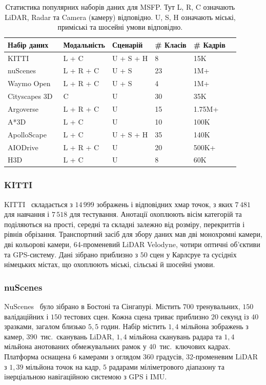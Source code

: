\begin{table}[t]
\centering
\caption{Статистика популярних наборів даних для MSFP. Тут L, R, C означають LiDAR, Radar та Camera (камеру) відповідно. U, S, H означають міські, приміські та шосейні умови відповідно.}
\label{tab:3Ddatasets}
\begin{tabular}{l|lllll}
\hline
\textbf{Набір даних} & \textbf{Модальність} & \textbf{Сценарій} & \textbf{\# Класів} & \textbf{\# Кадрів} \\
\hline
KITTI~\cite{geiger2012kitti}  & L + C & U + S + H & 8 & 15K \\
nuScenes~\cite{caesar2020nuscenes}  & L + R + C & U + S & 23 & 1M+ \\
Waymo Open~\cite{sun2020waymo}  & L + R + C & U + S & 4 & 1M+ \\
Cityscapes 3D~\cite{Gahlert2020Cityscapes3D} & C  & U & 30 & 35K \\
Argoverse~\cite{chang2019argoverse} & L + R + C & U & 15 & 1.75M+ \\
A*3D~\cite{pham2020a3d} & L + C  & U & 10 & 100K \\
ApolloScape~\cite{huang2018apolloscape} & L + C & U + S + H & 35 & 140K \\
AIODrive~\cite{weng2020all} & L + R + C  & U & 20 & 500K+ \\
H3D~\cite{patil2019h3d}  & L + C & U & 8 & 60K \\
\hline
\end{tabular}
\end{table}


\subsubsection{KITTI}
KITTI~\cite{geiger2012kitti} складається з $14\,999$ зображень і відповідних хмар точок, з яких $7\,481$ для навчання і $7\,518$ для тестування. Анотації охоплюють вісім категорій та поділяються на прості, середні та складні залежно від розміру, перекриттів і рівнів обрізання.
Транспортний засіб для збору даних мав дві монохромні камери, дві кольорові камери, 64-променевий LiDAR Velodyne, чотири оптичні об'єктиви та GPS-систему. Дані зібрано приблизно з $50$ сцен у Карлсруе та сусідніх німецьких містах, що охоплюють міські, сільські й шосейні умови.


\subsubsection{nuScenes}
NuScenes~\cite{caesar2020nuscenes} було зібрано в Бостоні та Сінгапурі. Містить $700$ тренувальних, $150$ валідаційних і $150$ тестових сцен. Кожна сцена триває приблизно $20$ секунд із $40$ зразками, загалом близько $5{,}5$ годин. Набір містить $1{,}4$ мільйона зображень з камер, $390$~тис.\ сканувань LiDAR, $1{,}4$ мільйона сканувань радара та $1{,}4$ мільйона анотованих обмежувальних рамок у $40$~тис.\ ключових кадрах.
Платформа оснащена $6$ камерами з оглядом 360 градусів, 32-променевим LiDAR з $1{,}39$ мільйона точок на кадр, $5$ радарами міліметрового діапазону та інерціальною навігаційною системою з GPS і IMU.

